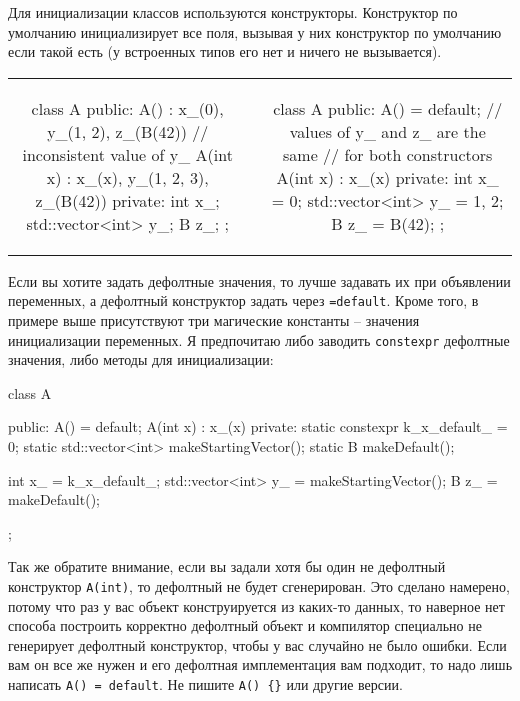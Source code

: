 Для инициализации классов используются конструкторы.
Конструктор по умолчанию инициализирует все поля, вызывая у них конструктор по умолчанию если такой есть (у встроенных типов его нет и ничего не вызывается).
\begin{center}
\begin{tabular}{ccc}
{
\begin{minipage}[\baselineskip]{8cm}
\begin{cppcode}
class A {
public:
  A()
   : x_(0), y_({1, 2}), z_(B(42)) {}
  // inconsistent value of y_
  A(int x)
   : x_(x), y_({1, 2, 3}), z_(B(42)) {}
private:
  int x_;
  std::vector<int> y_;
  B z_;
};
\end{cppcode}
\end{minipage}
}&{}&{
\begin{minipage}[\baselineskip]{8cm}
\begin{cppcode}
class A {
public:
  A() = default;
  // values of y_ and z_ are the same
  // for both constructors
  A(int x)
   : x_(x) {}
private:
  int x_ = 0;
  std::vector<int> y_ = {1, 2};
  B z_ = B(42);
};
\end{cppcode}
\end{minipage}
}
\end{tabular}
\end{center}
Если вы хотите задать дефолтные значения, то лучше задавать их при объявлении переменных, а дефолтный конструктор задать через \verb"=default".
Кроме того, в примере выше присутствуют три магические константы -- значения инициализации переменных.
Я предпочитаю либо заводить \verb"constexpr" дефолтные значения, либо методы для инициализации:
\begin{cppcode}
class A {
public:
  A() = default;
  A(int x) : x_(x) {}
private:
  static constexpr k_x_default_ = 0;
  static std::vector<int> makeStartingVector();
  static B makeDefault();
  
  int x_ = k_x_default_;
  std::vector<int> y_ = makeStartingVector();
  B z_ = makeDefault();
};
\end{cppcode}
Так же обратите внимание, если вы задали хотя бы один не дефолтный конструктор \verb"A(int)", то дефолтный не будет сгенерирован.
Это сделано намерено, потому что раз у вас объект конструируется из каких-то данных, то наверное нет способа построить корректно дефолтный объект и компилятор специально не генерирует дефолтный конструктор, чтобы у вас случайно не было ошибки.
Если вам он все же нужен и его дефолтная имплементация вам подходит, то надо лишь написать \verb"A() = default".
Не пишите \verb"A() {}" или другие версии.

